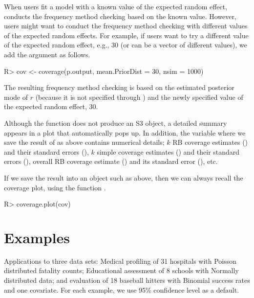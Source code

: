 \documentclass[article]{jss}
\begin{document}
When users fit a model with a known value of the expected random effect,  conducts the frequency method checking based on the known value. However, users might want to conduct the frequency method checking with different values of the expected random effects. For example, if users want to try  a different value of the expected random effect, e.g., 30 (or can be a vector of different values), we add the argument  as follows.
\begin{CodeChunk}
\begin{CodeInput}
R> cov <- coverage(p.output, mean.PriorDist = 30, nsim = 1000)
\end{CodeInput}
\end{CodeChunk}
The resulting frequency method checking is based on the estimated posterior mode of $r$ (because it is not specified through ) and the newly specified value of the expected random effect, 30.

Although the function  does not produce an S3 object, a detailed summary appears in a plot that automatically pops up. In addition, the variable   where we save  the result of  as above contains numerical details; $k$ RB coverage estimates () and their standard errors (), $k$ simple coverage estimates () and their standard errors (), overall RB coverage estimate () and its standard error (), etc.


If we save the result into an object such as  above, then we can always recall the coverage plot, using the function .
\begin{CodeChunk}
\begin{CodeInput}
R> coverage.plot(cov)
\end{CodeInput}
\end{CodeChunk}


\section[Examples]{Examples}\label{sec6}
Applications to three data sets: Medical profiling of 31 hospitals with Poisson distributed fatality counts; Educational assessment of 8 schools with Normally distributed data; and evaluation of 18 baseball hitters with Binomial success rates and one covariate. For each example, we use 95\% confidence level as a default.
\end{document}
